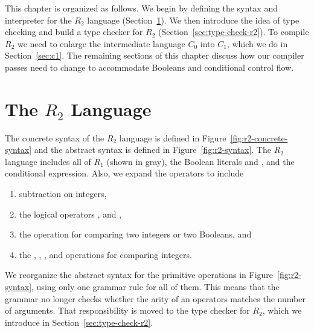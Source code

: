 \documentclass[11pt]{book}
\begin{document}
This chapter is organized as follows.  We begin by defining the syntax
and interpreter for the $R_2$ language (Section~\ref{sec:r2-lang}). We
then introduce the idea of type checking and build a type checker for
$R_2$ (Section~\ref{sec:type-check-r2}). To compile $R_2$ we need to
enlarge the intermediate language $C_0$ into $C_1$, which we do in
Section~\ref{sec:c1}. The remaining sections of this chapter discuss
how our compiler passes need to change to accommodate Booleans and
conditional control flow.


\section{The $R_2$ Language}
\label{sec:r2-lang}

The concrete syntax of the $R_2$ language is defined in
Figure~\ref{fig:r2-concrete-syntax} and the abstract syntax is defined
in Figure~\ref{fig:r2-syntax}. The $R_2$ language includes all of
$R_1$ (shown in gray), the Boolean literals  and ,
and the conditional  expression. Also, we expand the
operators to include
\begin{enumerate}
\item subtraction on integers,
\item the logical operators ,  and ,
\item the  operation for comparing two integers or two Booleans, and
\item the \key{<}, \key{<=}, \key{>}, and \key{>=} operations for
  comparing integers.
\end{enumerate}
We reorganize the abstract syntax for the primitive operations in
Figure~\ref{fig:r2-syntax}, using only one grammar rule for all of
them. This means that the grammar no longer checks whether the arity
of an operators matches the number of arguments. That responsibility
is moved to the type checker for $R_2$, which we introduce in
Section~\ref{sec:type-check-r2}.
\end{document}
